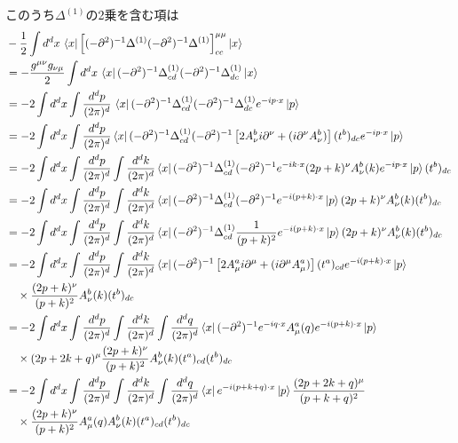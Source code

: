 このうち$\Delta^{(1)}$の2乗を含む項は
\begin{align*}
  & -\frac{1}{2} \int d^dx \, \bra{x} \left[ (-\partial^2)^{-1} \Delta^{(1)} (-\partial^2)^{-1} \Delta^{(1)} \right]_{cc}^{\mu\mu} \ket{x} \\
  &= -\frac{g^{\mu\nu} g_{\nu\mu}}{2}\int d^dx \, \bra{x} (-\partial^2)^{-1} \Delta^{(1)}_{cd} (-\partial^2)^{-1} \Delta^{(1)}_{dc} \ket{x} \\
  &= -2\int d^dx \int\frac{d^dp}{(2\pi)^d} \, \bra{x} (-\partial^2)^{-1} \Delta^{(1)}_{cd}
  (-\partial^2)^{-1} \Delta^{(1)}_{dc} e^{-ip\cdot x} \ket{p} \\
  &= -2\int d^dx \int\frac{d^dp}{(2\pi)^d} \bra{x} (-\partial^2)^{-1} \Delta^{(1)}_{cd} (-\partial^2)^{-1}
  \left[ 2A_\nu^b i \partial^\nu + (i\partial^\nu A_\nu^b) \right] (t^b)_{dc} e^{-ip\cdot x} \ket{p} \\
  &= -2\int d^dx \int\frac{d^dp}{(2\pi)^d} \int\frac{d^dk}{(2\pi)^d} \bra{x} (-\partial^2)^{-1}
  \Delta^{(1)}_{cd} (-\partial^2)^{-1} e^{-ik\cdot x} (2p+k)^\nu A_\nu^b(k) e^{-ip\cdot x} \ket{p} (t^b)_{dc} \\
  &= -2\int d^dx \int\frac{d^dp}{(2\pi)^d} \int\frac{d^dk}{(2\pi)^d} \bra{x} (-\partial^2)^{-1}
  \Delta^{(1)}_{cd} (-\partial^2)^{-1} e^{-i(p+k)\cdot x} \ket{p} (2p+k)^\nu A_\nu^b(k) (t^b)_{dc} \\
  &= -2\int d^dx \int\frac{d^dp}{(2\pi)^d} \int\frac{d^dk}{(2\pi)^d} \bra{x} (-\partial^2)^{-1}
  \Delta^{(1)}_{cd} \frac{1}{(p+k)^2} e^{-i(p+k)\cdot x} \ket{p} (2p+k)^\nu A_\nu^b(k) (t^b)_{dc} \\
  &= -2\int d^dx \int\frac{d^dp}{(2\pi)^d} \int\frac{d^dk}{(2\pi)^d} \bra{x} (-\partial^2)^{-1}
  \left[ 2A_\mu^a i \partial^\mu + (i\partial^\mu A_\mu^a) \right] (t^a)_{cd} e^{-i(p+k)\cdot x} \ket{p} \\
  &\quad\times \frac{(2p+k)^\nu}{(p+k)^2} A_\nu^b(k) (t^b)_{dc} \\
  &= -2\int d^dx \int\frac{d^dp}{(2\pi)^d} \int\frac{d^dk}{(2\pi)^d} \int\frac{d^dq}{(2\pi)^d}
  \bra{x} (-\partial^2)^{-1} e^{-iq\cdot x} A_\mu^a(q) e^{-i(p+k)\cdot x} \ket{p} \\
  &\quad\times (2p+2k+q)^\mu \frac{(2p+k)^\nu}{(p+k)^2} A_\nu^b(k) (t^a)_{cd} (t^b)_{dc} \\
  &= -2\int d^dx \int\frac{d^dp}{(2\pi)^d} \int\frac{d^dk}{(2\pi)^d} \int\frac{d^dq}{(2\pi)^d}
  \bra{x} e^{-i(p+k+q)\cdot x} \ket{p} \frac{(2p+2k+q)^\mu}{(p+k+q)^2} \\
  &\quad\times \frac{(2p+k)^\nu}{(p+k)^2} A_\mu^a(q) A_\nu^b(k) (t^a)_{cd} (t^b)_{dc} \\

\end{align*}

